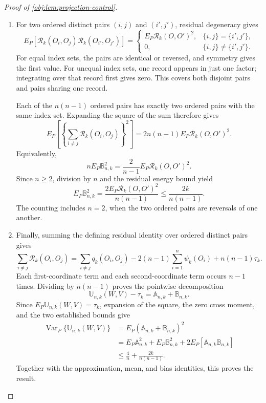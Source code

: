 \documentclass[11pt]{article}
\begin{document}
\begin{proof}[Proof of \cref{obj:lem:projection-control}]
\begin{enumerate}
\item For two ordered distinct pairs \((i,j)\) and \((i',j')\), residual degeneracy gives
\[
E_P[
 \mathcal R_k(O_i,O_j)\mathcal R_k(O_{i'},O_{j'})
]
=
\begin{cases}
E_P\mathcal R_k(O,O')^2,
 &\{i,j\}=\{i',j'\},\\
0,&\{i,j\}\ne\{i',j'\}.
\end{cases}
\]
For equal index sets, the pairs are identical or reversed, and symmetry gives the first value. For unequal index sets, one record appears in just one factor; integrating over that record first gives zero. This covers both disjoint pairs and pairs sharing one record.

Each of the \(n(n-1)\) ordered pairs has exactly two ordered pairs with the same index set. Expanding the square of the sum therefore gives
\[
E_P\left[
 \left\{\sum_{i\ne j}\mathcal R_k(O_i,O_j)\right\}^2
\right]
=2n(n-1)E_P\mathcal R_k(O,O')^2.
\]
Equivalently,
\[
nE_P\mathbb B_{n,k}^2
=\frac2{n-1}E_P\mathcal R_k(O,O')^2.
\]
Since \(n\ge2\), division by \(n\) and the residual energy bound yield
\[
E_P\mathbb B_{n,k}^2
=\frac{2E_P\mathcal R_k(O,O')^2}{n(n-1)}
\le\frac{2k}{n(n-1)}.
\]
The counting includes \(n=2\), when the two ordered pairs are reversals of one another.

\item Finally, summing the defining residual identity over ordered distinct pairs gives
\[
\sum_{i\ne j}\mathcal R_k(O_i,O_j)
=\sum_{i\ne j}q_k(O_i,O_j)
 -2(n-1)\sum_{i=1}^n\psi_k(O_i)+n(n-1)\tau_k.
\]
Each first-coordinate term and each second-coordinate term occurs \(n-1\) times. Dividing by \(n(n-1)\) proves the pointwise decomposition
\[
\mathbb U_{n,k}(W,V)-\tau_k
=\mathbb A_{n,k}+\mathbb B_{n,k}.
\]
Since \(E_P\mathbb U_{n,k}(W,V)=\tau_k\), expansion of the square, the zero cross moment, and the two established bounds give
\[
\begin{aligned}
\operatorname{Var}_P\{\mathbb U_{n,k}(W,V)\}
&=E_P(\mathbb A_{n,k}+\mathbb B_{n,k})^2\\
&=E_P\mathbb A_{n,k}^2+E_P\mathbb B_{n,k}^2
  +2E_P[\mathbb A_{n,k}\mathbb B_{n,k}]\\
&\le\frac4n+\frac{2k}{n(n-1)}.
\end{aligned}
\]
Together with the approximation, mean, and bias identities, this proves the result.
\end{enumerate}
\end{proof}
\end{document}
